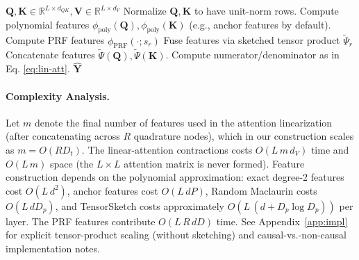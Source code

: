 \documentclass{article}
\DeclareRobustCommand{\E}{\text{\normalfont\tifinaghfont ⵟ}}
\newcommand{\R}{\mathbb{R}}
\begin{document}
\begin{algorithm}[t]
\caption{Spherical \E-Attention Forward Pass}
\begin{algorithmic}[1]
\REQUIRE $\mathbf{Q},\mathbf{K}\in\R^{L\times d_{QK}}, \mathbf{V} \in \mathbb{R}^{L \times d_{V}}$
\STATE Normalize $\mathbf{Q},\mathbf{K}$ to have unit-norm rows.
\STATE Compute polynomial features $\phi_{\text{poly}}(\mathbf{Q}),\phi_{\text{poly}}(\mathbf{K})$ (e.g., anchor features by default).
\STATE Compute PRF features $\phi_{\text{PRF}}(\cdot; s_r)$
\STATE Fuse features via sketched tensor product $\widetilde{\Psi}_r$
\ENDFOR
\STATE Concatenate features $\widetilde{\Psi}(\mathbf{Q}),\widetilde{\Psi}(\mathbf{K})$.
\STATE Compute numerator/denominator as in Eq. \ref{eq:lin-att}.
\RETURN $\widehat{\mathbf{Y}}$
\end{algorithmic}
\end{algorithm}
\paragraph{Complexity Analysis.}
Let $m$ denote the final number of features used in the attention linearization (after concatenating across $R$ quadrature nodes), which in our construction scales as $m=O(RD_t)$. The linear-attention contractions costs $O(L\,m\,d_{V})$ time and $O(L\,m)$ space (the $L\times L$ attention matrix is never formed).
Feature construction depends on the polynomial approximation: exact degree-2 features cost $O(L\,d^2)$, anchor features cost $O(L\,dP)$, Random Maclaurin costs $O(L\,dD_p)$, and TensorSketch costs approximately $O(L\,(d + D_p\log D_p))$ per layer.
The PRF features contribute $O(L\,R\,dD)$ time.
See Appendix~\ref{app:impl} for explicit tensor-product scaling (without sketching) and causal-vs.-non-causal implementation notes.
\vspace{-3mm}
\end{document}
